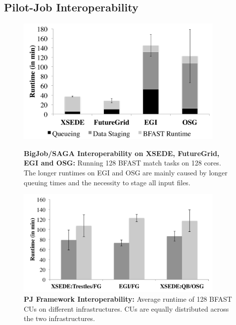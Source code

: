 \documentclass[]{paper}
\begin{document}
\subsection{Pilot-Job Interoperability}

\begin{figure} [t]
	\begin{minipage}[t]{0.48\textwidth}
	\centering 
	\includegraphics[width=0.9\textwidth]{figures/128-bfast-egi-fg-xsede-osg.pdf}
	\caption{\textbf{BigJob/SAGA Interoperability on XSEDE, FutureGrid, EGI and 
	  OSG:} Running 128 BFAST match tasks on 128 cores. The longer runtimes on EGI 
	  and OSG are mainly caused by  longer queuing times and the necessity to      
	  stage all input files.}
	  \label{fig:perf_perf-bfast-bj}
	\end{minipage}\hspace{2mm}
	\begin{minipage}[t]{0.48\textwidth}
	  	\centering
	\includegraphics[width=0.9\textwidth]{figures/128-bfast-interop-with-staging.pdf}
		\caption{\textbf{PJ Framework Interoperability:} Average runtime of
	          128 BFAST CUs on different infrastructures. CUs are
	          equally distributed across the two infrastructures.}
		\label{fig:perf_interop_128-bfast-interop}
	\end{minipage}

\end{figure}
\end{document}
